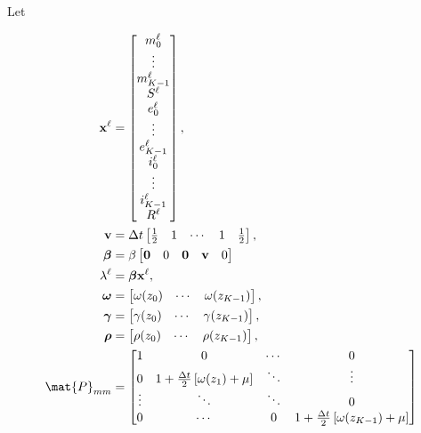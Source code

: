 \documentclass{jpmarticle}
\renewcommand{\vec}[1]{\boldsymbol{\mathrm{#1}}}
\let\subequationsorig\subequations%
\let\endsubequationsorig\endsubequations%
\renewenvironment{subequations}{
  \subequationsorig
  \renewcommand{\theequation}{\theparentequation.\arabic{equation}}
}{
  \endsubequationsorig
}
\begin{document}
Let
\begin{subequations}
  \begin{align}
    \vec{x}^{\ell} &=
    \begin{bmatrix}
      m_0^{\ell} \\ \vdots \\ m_{K - 1}^{\ell} \\
      S^{\ell} \\
      e_0^{\ell} \\ \vdots \\ e_{K - 1}^{\ell} \\
      i_0^{\ell} \\ \vdots \\ i_{K - 1}^{\ell} \\
      R^{\ell}
    \end{bmatrix},
    \\
    \vec{v} &=
    \Delta t
    \begin{bmatrix}
      \frac{1}{2} & 1 & \cdots & 1 & \frac{1}{2}
    \end{bmatrix},
    \\
    \vec{\beta} &=
    \beta
    \begin{bmatrix}
      \vec{0} & 0 & \vec{0} & \vec{v} & 0
    \end{bmatrix}
    \\
    \lambda^{\ell} &=
    \vec{\beta} \vec{x}^{\ell},
    \\
    \vec{\omega} &=
    \begin{bmatrix}
      \omega(z_0) & \cdots & \omega(z_{K - 1})
    \end{bmatrix},
    \\
    \vec{\gamma} &=
    \begin{bmatrix}
      \gamma(z_0) & \cdots & \gamma(z_{K - 1})
    \end{bmatrix},
    \\
    \vec{\rho} &=
    \begin{bmatrix}
      \rho(z_0) & \cdots & \rho(z_{K - 1})
    \end{bmatrix},
    \\
    \mat{P}_{mm} &=
    \begin{bmatrix}
      1 & 0 & \cdots & 0
      \\
      0 & 1 + \frac{\Delta t}{2} \left[\omega(z_1) + \mu\right] &
      \ddots & \vdots
      \\
      \vdots & \ddots & \ddots & 0
      \\
      0 & \cdots & 0 &
      1 + \frac{\Delta t}{2} \left[\omega(z_{K - 1}) + \mu\right]

\end{bmatrix}
\end{align}
\end{subequations}
\end{document}
